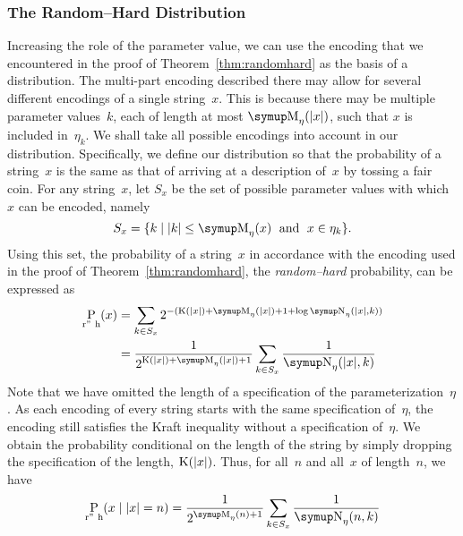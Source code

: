 \subsubsection{The Random--Hard Distribution}
Increasing the role of the parameter value, we can use the encoding that we encountered in the proof of Theorem~\ref{thm:randomhard} as the basis of a distribution.
The multi-part encoding described there may allow for several different encodings of a single string~$x$.
This is because there may be multiple parameter values~$k$, each of length at most $\upM_\eta(\length{x})$, such that $x$ is included in~$\eta_k$.
We shall take all possible encodings into account in our distribution.
Specifically, we define our distribution so that the probability of a string~$x$ is the same as that of arriving at a description of~$x$ by tossing a fair coin.
For any string~$x$, let $S_x$ be the set of possible parameter values with which $x$ can be encoded, namely
\begin{equation*}
  S_x \deq\{k \st \length{k} \le \upM_\eta(x) \reland x \in \eta_k\}.
\end{equation*}
Using this set, the probability of a string~$x$ in accordance with the encoding used in the proof of Theorem~\ref{thm:randomhard}, the \emph{random--hard} probability, can be expressed as
\begin{align*}
  \Pr_\mathrm{r"~h}(x) &\deq \sum_{k \in S_x} 2^{-(\KC(\length{x}) + \upM_\eta(\length{x}) + 1 + \log \upN_\eta(\length{x}, k))} \\
    &= \frac{1}{2^{\KC(\length{x}) + \upM_\eta(\length{x}) + 1}} \sum_{k \in S_x} \frac{1}{\upN_\eta(\length{x}, k)}
\end{align*}
Note that we have omitted the length of a specification of the parameterization~$\eta$.
As each encoding of every string starts with the same specification of~$\eta$, the encoding still satisfies the Kraft inequality without a specification of~$\eta$.
We obtain the probability conditional on the length of the string by simply dropping the specification of the length, $\operatorname{K}({\lvert x\rvert})$.
Thus, for all~$n$ and all~$x$ of length~$n$, we have
\begin{equation*}
  \Pr_\mathrm{r"~h}(x \given \length{x} = n) = \frac{1}{2^{\upM_\eta(n) + 1}} \sum_{k \in S_x} \frac{1}{\upN_\eta(n, k)}
\end{equation*}

